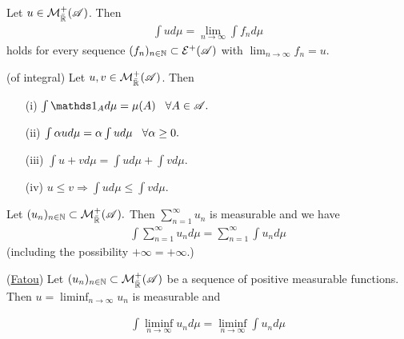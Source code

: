 \begin{corollary}
    Let $u\in \mathcal{M}_{\bar{\mathbb{R}}}^+(\mathscr{A})$. Then \begin{align*}
        \int ud\mu = \lim_{n\rightarrow \infty} \int f_n d\mu
    \end{align*}
    holds for every sequence $(f_n)_{n\in\mathbb{N}}\subset \mathcal{E}^+(\mathscr{A})$ with $\lim_{n\rightarrow\infty} f_n=u.$

\end{corollary}


\begin{proposition} (of integral)
    Let $u,v\in\mathcal{M}_{\bar{\mathbb{R}}}^+(\mathscr{A})$. Then
    \begin{enumerate}
        \item[(i)] $\int \one_A d\mu = \mu(A)\hspace{3mm}\forall A\in\A.$
        \item[(ii)] $\int \alpha ud\mu = \alpha\int u d\mu \hspace{3mm} \forall \alpha\geq 0.$
        \item[(iii)] $\int u+v d\mu = \int u d\mu +\int v d\mu.$
        \item[(iv)]  $u\leq v\Rightarrow \int u d\mu\leq \int v d\mu.$
    \end{enumerate}
\end{proposition}

\begin{corollary}
    Let $(u_n)_{n\in\mathbb{N}}\subset \mathcal{M}_{\bar{\mathbb{R}}}^+(\mathscr{A}).$ Then $\sum_{n=1}^\infty u_n$ is measurable and we have
    \begin{align*}
        \int \sum_{n=1}^\infty u_n d\mu = \sum_{n=1}^\infty \int u_nd\mu
    \end{align*}
    (including the possibility $+\infty = +\infty.$)
\end{corollary}

\begin{theorem}(\underline{Fatou})
    Let $(u_n)_{n\in\mathbb{N}}\subset \mathcal{M}_{\bar{\mathbb{R}}}^+(\mathscr{A})$ be a sequence of positive measurable functions. Then 
$u=\liminf_{n\rightarrow\infty} u_n$ is measurable and 

\begin{align}
    \int\liminf_{n\rightarrow\infty}u_n d\mu =\liminf_{n\rightarrow\infty}\int u_n d\mu 
\end{align}
\end{theorem} 